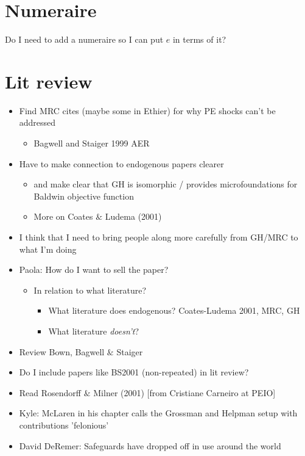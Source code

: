\documentclass[12pt]{article}
\begin{document}
\section{Numeraire}
Do I need to add a numeraire so I can put $e$ in terms of it?


\section{Lit review}
\begin{itemize}
	\item Find MRC cites (maybe some in Ethier) for why PE shocks can't be addressed
		\begin{itemize}
			\item Bagwell and Staiger 1999 AER
		\end{itemize}
	\item Have to make connection to endogenous papers clearer
		\begin{itemize}
			\item and make clear that GH is isomorphic / provides microfoundations for Baldwin objective function
			\item More on Coates $\&$ Ludema (2001)
		\end{itemize}
	\item I think that I need to bring people along more carefully from GH/MRC to what I'm doing
	\item Paola: How do I want to sell the paper?
		\begin{itemize}
			\item In relation to what literature?
				\begin{itemize}
					\item What literature does endogenous? Coates-Ludema 2001, MRC, GH
					\item What literature \textit{doesn't}?
				\end{itemize}
			\end{itemize}
	\item Review Bown, Bagwell $\&$ Staiger
	\item Do I include papers like BS2001 (non-repeated) in lit review?
	\item Read Rosendorff $\&$ Milner (2001) [from Cristiane Carneiro at PEIO]
	\item Kyle: McLaren in his chapter calls the Grossman and Helpman setup with
	 contributions 'felonious'
	\item David DeRemer: Safeguards have dropped off in use around the world
		\begin{itemize}

\end{itemize}
\end{itemize}
\end{document}
